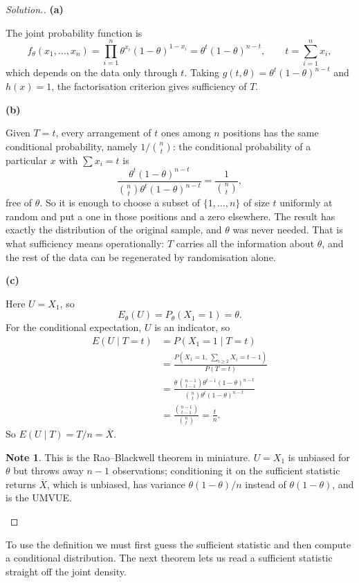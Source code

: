 \documentclass[12pt,a4paper]{report}
\theoremstyle{definition}
\newtheorem*{note}{Note}
\newcommand{\subhead}[1]{%
  \par\medskip\noindent\textbf{#1}\par\nobreak\smallskip}
\newenvironment{solution}
  {\renewcommand{\qedsymbol}{}\begin{proof}[\textit{Solution}.]}
  {\end{proof}}
\begin{document}
\begin{solution}
\subhead{(a)}
The joint probability function is
\[f_{\theta}(x_1,\dots,x_n) = \prod_{i=1}^{n}\theta^{x_i}(1-\theta)^{1-x_i}
= \theta^{t}(1-\theta)^{n-t},\qquad t=\sum_{i=1}^{n}x_i ,\]
which depends on the data only through $t$. Taking $g(t,\theta)=\theta^{t}(1-\theta)^{n-t}$
and $h(x)=1$, the factorisation criterion gives sufficiency of $T$.

\subhead{(b)}
Given $T=t$, every arrangement of $t$ ones among $n$ positions has the same
conditional probability, namely $1/\binom{n}{t}$: the conditional probability of
a particular $x$ with $\sum x_i=t$ is
\[\frac{\theta^{t}(1-\theta)^{n-t}}{\binom{n}{t}\theta^{t}(1-\theta)^{n-t}}
= \frac{1}{\binom{n}{t}},\]
free of $\theta$. So it is enough to choose a subset of $\{1,\dots,n\}$ of size
$t$ uniformly at random and put a one in those positions and a zero elsewhere.
The result has exactly the distribution of the original sample, and $\theta$ was
never needed. That is what sufficiency means operationally: $T$ carries all the
information about $\theta$, and the rest of the data can be regenerated by
randomisation alone.

\subhead{(c)}
Here $U=X_1$, so
\[E_{\theta}(U) = P_{\theta}\left(X_1=1\right) = \theta .\]
For the conditional expectation, $U$ is an indicator, so
\begin{align*}
E\left(U \mid T=t\right) &= P\left(X_1=1 \mid T=t\right)\\
&= \frac{P\left(X_1=1,\ \sum_{i\geq 2}X_i = t-1\right)}{P(T=t)}\\
&= \frac{\theta\,\binom{n-1}{t-1}\theta^{t-1}(1-\theta)^{n-t}}
       {\binom{n}{t}\theta^{t}(1-\theta)^{n-t}}\\
&= \frac{\binom{n-1}{t-1}}{\binom{n}{t}} = \frac{t}{n}.
\end{align*}
So $E\left(U\mid T\right) = T/n = \overline{X}$.

\begin{note}
This is the Rao--Blackwell theorem in miniature. $U=X_1$ is unbiased for
$\theta$ but throws away $n-1$ observations; conditioning it on the sufficient
statistic returns $\overline{X}$, which is unbiased, has variance
$\theta(1-\theta)/n$ instead of $\theta(1-\theta)$, and is the UMVUE.
\end{note}
\end{solution}

To use the definition we must first guess the sufficient statistic and then
compute a conditional distribution. The next theorem lets us read a sufficient
statistic straight off the joint density.
\end{document}
